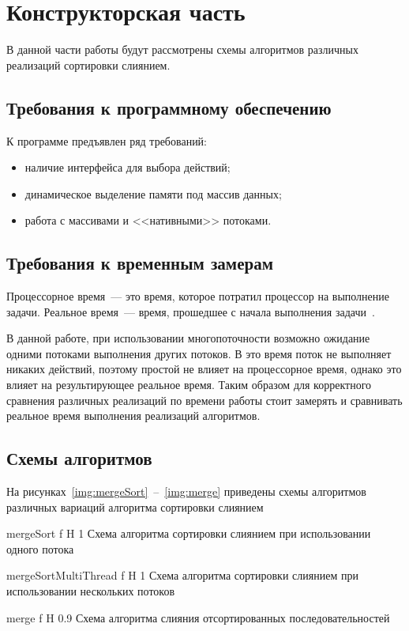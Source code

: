\chapter{Конструкторская часть}
В данной части работы будут рассмотрены схемы алгоритмов различных реализаций сортировки слиянием.

\section{Требования к программному обеспечению}
К программе предъявлен ряд требований:
\begin{itemize}
	\item наличие интерфейса для выбора действий;
	\item динамическое выделение памяти под массив данных;
	\item работа с массивами и <<нативными>> потоками.
\end{itemize}

\section{Требования к временным замерам}
Процессорное время~--- это время, которое потратил процессор  на выполнение задачи.
Реальное время~--- время, прошедшее с начала выполнения задачи~\cite{time}. 

В данной работе, при использовании многопоточности возможно ожидание одними потоками выполнения других потоков. 
В это время поток не выполняет никаких действий, поэтому простой не влияет на процессорное время, однако это влияет на результирующее реальное время.
Таким образом для корректного сравнения различных реализаций по времени работы стоит замерять и сравнивать реальное время
выполнения реализаций алгоритмов.

\section{Схемы алгоритмов}
На рисунках~\ref{img:mergeSort}~--~\ref{img:merge} приведены схемы алгоритмов различных вариаций алгоритма сортировки слиянием

{mergeSort} 
{f} 
{H} 
{1\textwidth} 
{Схема алгоритма сортировки слиянием при использовании одного потока} 

{mergeSortMultiThread}
{f}
{H} 
{1\textwidth} 
{Схема алгоритма сортировки слиянием при использовании нескольких потоков}

{merge}
{f} 
{H} 
{0.9\textwidth} 
{Схема алгоритма слияния отсортированных последовательностей}

